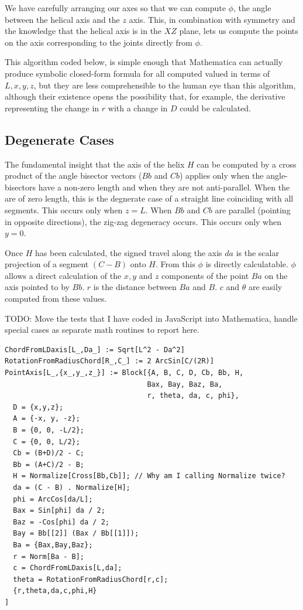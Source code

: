 \documentclass[11pt]{article}
\begin{document}
{We have carefully arranging our axes
so that we can compute $\phi$, the angle between the helical axis
and the $z$ axis. This, in combination with symmetry and the knowledge
that the helical axis is in the $XZ$ plane, lets us compute the
points on the axis corresponding to the joints directly from $\phi$.

This algorithm coded below, is simple enough that Mathematica can
actually produce symbolic closed-form formula for all computed valued
in terms of $L, x, y, z$, but they are less comprehensible to the
human eye than this algorithm, although their existence opens
the possibility that, for example, the derivative representing
the change in $r$ with a change in $D$ could be calculated.

\subsection{Degenerate Cases}

The fundamental insight that the axis of the helix $H$ can be
computed by a cross product of the angle bisector
vectors ($Bb$ and $Cb$) applies only
when the angle-bisectors have a non-zero length and when
they are not anti-parallel. When the are of zero length, this is
the degnerate case of a straight line coinciding with all segments.
This occurs only when $z = L$.
When $Bb$ and $Cb$ are parallel (pointing in opposite directions),
the zig-zag degeneracy occurs. This occurs only when $y = 0$.

Once $H$ has been calculated, the signed travel along the axis $da$ is
the scalar projection of a segment $(C - B)$ onto $H$.
From this $\phi$ is directly calculatable. $\phi$ allows
a direct calculation of the $x,y$ and $z$ components of the
point $Ba$ on the axis pointed to by $Bb$.
$r$ is the distance between $Ba$ and $B$. $c$ and $\theta$
are easily computed from these values.

TODO: Move the tests that I have coded in JavaScript into
Mathematica, handle special cases as separate math routines
to report here.

\begin{lstlisting}
ChordFromLDaxis[L_,Da_] := Sqrt[L^2 - Da^2]
RotationFromRadiusChord[R_,C_] := 2 ArcSin[C/(2R)]
PointAxis[L_,{x_,y_,z_}] := Block[{A, B, C, D, Cb, Bb, H,
                                  Bax, Bay, Baz, Ba,
                                  r, theta, da, c, phi},
  D = {x,y,z};
  A = {-x, y, -z};
  B = {0, 0, -L/2};
  C = {0, 0, L/2};
  Cb = (B+D)/2 - C;
  Bb = (A+C)/2 - B;
  H = Normalize[Cross[Bb,Cb]]; // Why am I calling Normalize twice?
  da = (C - B) . Normalize[H];
  phi = ArcCos[da/L];
  Bax = Sin[phi] da / 2;
  Baz = -Cos[phi] da / 2;
  Bay = Bb[[2]] (Bax / Bb[[1]]);
  Ba = {Bax,Bay,Baz};
  r = Norm[Ba - B];
  c = ChordFromLDaxis[L,da];
  theta = RotationFromRadiusChord[r,c];
  {r,theta,da,c,phi,H}
]
\end{lstlisting}

}
\end{document}
